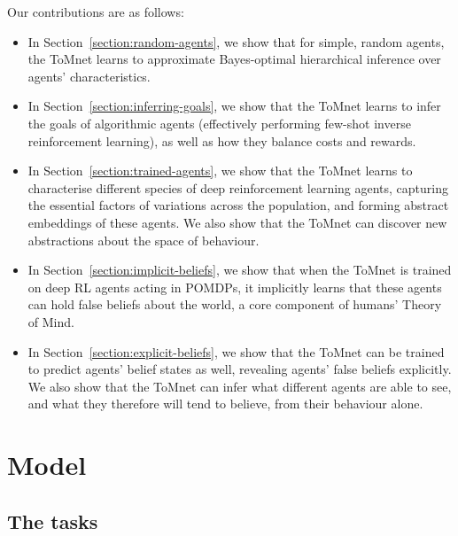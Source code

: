 \documentclass{article}
\begin{document}
Our contributions are as follows:
\begin{itemize}
    \item In Section~\ref{section:random-agents}, we show that for simple, random agents, the ToMnet learns to approximate Bayes-optimal hierarchical inference over agents' characteristics.
    \item In Section~\ref{section:inferring-goals}, we show that the ToMnet learns to infer the goals of algorithmic agents (effectively performing few-shot inverse reinforcement learning), as well as how they balance costs and rewards.
    \item In Section~\ref{section:trained-agents}, we show that the ToMnet learns to characterise different species of deep reinforcement learning agents, capturing the essential factors of variations across the population, and forming abstract embeddings of these agents. We also show that the ToMnet can discover new abstractions about the space of behaviour.
    \item In Section~\ref{section:implicit-beliefs}, we show that when the ToMnet is trained on deep RL agents acting in POMDPs, it implicitly learns that these agents can hold false beliefs about the world, a core component of humans' Theory of Mind.
    \item In Section~\ref{section:explicit-beliefs}, we show that the ToMnet can be trained to predict agents' belief states as well, revealing agents' false beliefs explicitly. We also show that the ToMnet can infer what different agents are able to see, and what they therefore will tend to believe, from their behaviour alone. 
\end{itemize}


\section{Model}
\label{model}

\subsection{The tasks}
\label{section:tasks}

\newcommand{\Agent}{\mathcal{A}}
\newcommand{\MDP}{\mathcal{M}}
\newcommand{\Npast}{N_{\mathrm{past}}}
\end{document}
